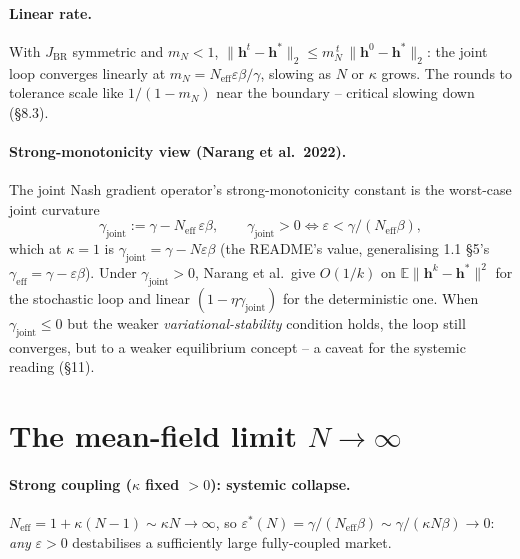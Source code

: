 \documentclass[11pt]{article}
\newcommand{\eps}{\varepsilon}
\newcommand{\BR}{\mathrm{BR}}
\newcommand{\Neff}{N_{\mathrm{eff}}}
\newcommand{\gj}{\gamma_{\mathrm{joint}}}
\newcommand{\bvh}{\bm{h}}
\begin{document}
\paragraph{Linear rate.}
With $J_{\BR}$ symmetric and $m_N<1$,
$\|\bvh^{t}-\bvh^*\|_2\le m_N^{\,t}\,\|\bvh^{0}-\bvh^*\|_2$: the joint loop converges
linearly at $m_N=\Neff\eps\beta/\gamma$, slowing as $N$ or $\kappa$ grows. The rounds
to tolerance scale like $1/(1-m_N)$ near the boundary -- critical slowing down (\S8.3).

\paragraph{Strong-monotonicity view (Narang et al.\ 2022).}
The joint Nash gradient operator's strong-monotonicity constant is the worst-case
joint curvature
%
\begin{equation}
  \gj := \gamma - \Neff\,\eps\beta,\qquad \gj>0 \iff \eps<\gamma/(\Neff\beta),
\end{equation}
%
which at $\kappa=1$ is $\gj=\gamma-N\eps\beta$ (the README's value, generalising 1.1
\S5's $\gamma_{\mathrm{eff}}=\gamma-\eps\beta$). Under $\gj>0$, Narang et al.\ give
$O(1/k)$ on $\mathbb{E}\|\bvh^k-\bvh^*\|^2$ for the stochastic loop and linear
$(1-\eta\gj)$ for the deterministic one. When $\gj\le 0$ but the weaker
\emph{variational-stability} condition holds, the loop still converges, but to a
weaker equilibrium concept -- a caveat for the systemic reading (\S11).

\section{The mean-field limit $N\to\infty$}

\paragraph{Strong coupling ($\kappa$ fixed $>0$): systemic collapse.}
$\Neff=1+\kappa(N-1)\sim\kappa N\to\infty$, so
$\eps^*(N)=\gamma/(\Neff\beta)\sim\gamma/(\kappa N\beta)\to 0$: \emph{any} $\eps>0$
destabilises a sufficiently large fully-coupled market.
\end{document}
